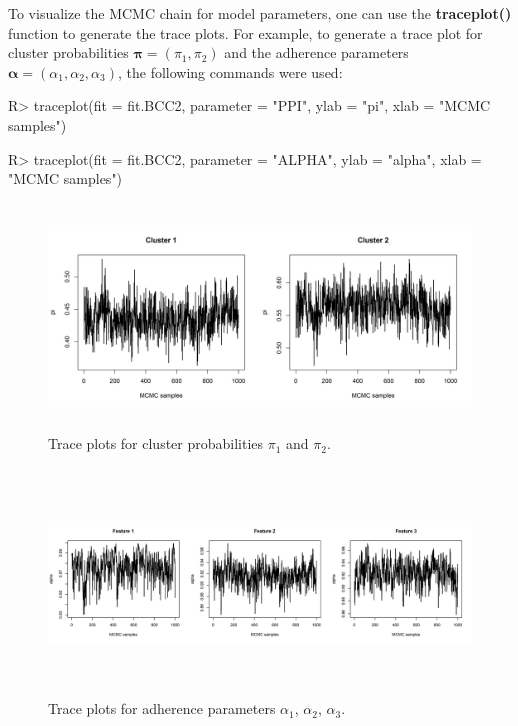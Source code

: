 To visualize the MCMC chain for model parameters, one can use the  \textbf{traceplot()} function to generate the trace plots. For example, to generate a trace plot for cluster probabilities $\boldsymbol{\pi} = (\pi_1, \pi_2)$ and the adherence parameters $\boldsymbol{\alpha}=(\alpha_1,\alpha_2,\alpha_3)$, the following commands were used: 

\begin{example}

R> traceplot(fit = fit.BCC2, parameter = "PPI", ylab = "pi", xlab = "MCMC samples")

R> traceplot(fit = fit.BCC2, parameter = "ALPHA", ylab = "alpha", xlab = "MCMC samples")

\end{example} 

\begin{figure}[h]
\centering
\includegraphics[width=\textwidth,height=6cm]{./Figures/trace_ppi.JPEG}
\caption{\label{fig:trace_ppi}  Trace plots for cluster probabilities $\pi_1$ and $\pi_2$.}
\end{figure}

\begin{figure}[h]
\centering
\includegraphics[width=\textwidth,height=6cm]{./Figures/trace_alpha.JPEG}
\caption{\label{fig:trace_alpha}  Trace plots for adherence parameters $\alpha_1$, $\alpha_2$, $\alpha_3$.}
\end{figure}

